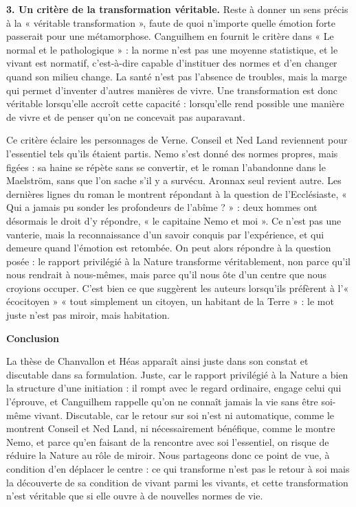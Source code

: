 \documentclass[11pt,a4paper]{article}
\begin{document}
\textbf{3. Un critère de la transformation véritable.} Reste à donner un sens précis à la « véritable transformation », faute de quoi n'importe quelle émotion forte passerait pour une métamorphose. Canguilhem en fournit le critère dans « Le normal et le pathologique » : la norme n'est pas une moyenne statistique, et le vivant est normatif, c'est-à-dire capable d'instituer des normes et d'en changer quand son milieu change. La santé n'est pas l'absence de troubles, mais la marge qui permet d'inventer d'autres manières de vivre. Une transformation est donc véritable lorsqu'elle accroît cette capacité : lorsqu'elle rend possible une manière de vivre et de penser qu'on ne concevait pas auparavant.

Ce critère éclaire les personnages de Verne. Conseil et Ned Land reviennent pour l'essentiel tels qu'ils étaient partis. Nemo s'est donné des normes propres, mais figées : sa haine se répète sans se convertir, et le roman l'abandonne dans le Maelström, sans que l'on sache s'il y a survécu. Aronnax seul revient autre. Les dernières lignes du roman le montrent répondant à la question de l'Ecclésiaste, « Qui a jamais pu sonder les profondeurs de l'abîme ? » : deux hommes ont désormais le droit d'y répondre, « le capitaine Nemo et moi ». Ce n'est pas une vanterie, mais la reconnaissance d'un savoir conquis par l'expérience, et qui demeure quand l'émotion est retombée. On peut alors répondre à la question posée : le rapport privilégié à la Nature transforme véritablement, non parce qu'il nous rendrait à nous-mêmes, mais parce qu'il nous ôte d'un centre que nous croyions occuper. C'est bien ce que suggèrent les auteurs lorsqu'ils préfèrent à l'« écocitoyen » « tout simplement un citoyen, un habitant de la Terre » : le mot juste n'est pas miroir, mais habitation.

\textbf{Conclusion}

La thèse de Chanvallon et Héas apparaît ainsi juste dans son constat et discutable dans sa formulation. Juste, car le rapport privilégié à la Nature a bien la structure d'une initiation : il rompt avec le regard ordinaire, engage celui qui l'éprouve, et Canguilhem rappelle qu'on ne connaît jamais la vie sans être soi-même vivant. Discutable, car le retour sur soi n'est ni automatique, comme le montrent Conseil et Ned Land, ni nécessairement bénéfique, comme le montre Nemo, et parce qu'en faisant de la rencontre avec soi l'essentiel, on risque de réduire la Nature au rôle de miroir. Nous partageons donc ce point de vue, à condition d'en déplacer le centre : ce qui transforme n'est pas le retour à soi mais la découverte de sa condition de vivant parmi les vivants, et cette transformation n'est véritable que si elle ouvre à de nouvelles normes de vie.
\end{document}
